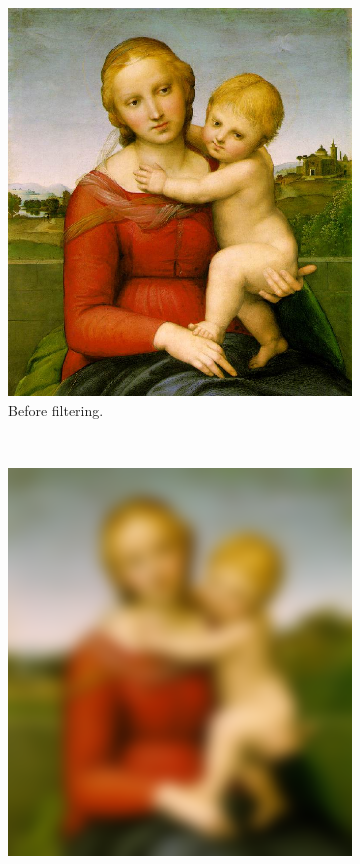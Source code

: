 \documentclass[two column]{article}
\begin{document}
\begin{figure}[h]
  \centering
  \begin{subfigure}{0.3\textwidth}
    \includegraphics[width=\textwidth]{im1.png}
    \caption{Before filtering.}
  \end{subfigure}
  ~%
  \begin{subfigure}{0.3\textwidth}
    \includegraphics[width=\textwidth]{im1test.png}

\end{subfigure}
\end{figure}
\end{document}
